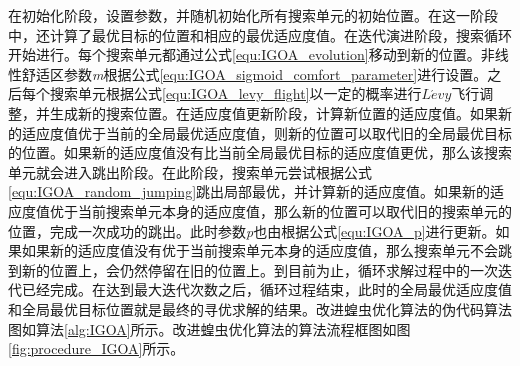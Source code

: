 在初始化阶段，设置参数，并随机初始化所有搜索单元的初始位置。在这一阶段中，还计算了最优目标的位置和相应的最优适应度值。在迭代演进阶段，搜索循环开始进行。每个搜索单元都通过公式\ref{equ:IGOA_evolution}移动到新的位置。非线性舒适区参数\emph{m}根据公式\ref{equ:IGOA_sigmoid_comfort_parameter}进行设置。之后每个搜索单元根据公式\ref{equ:IGOA_levy_flight}以一定的概率进行$L\acute{e}vy$飞行调整，并生成新的搜索位置。在适应度值更新阶段，计算新位置的适应度值。如果新的适应度值优于当前的全局最优适应度值，则新的位置可以取代旧的全局最优目标的位置。如果新的适应度值没有比当前全局最优目标的适应度值更优，那么该搜索单元就会进入跳出阶段。在此阶段，搜索单元尝试根据公式\ref{equ:IGOA_random_jumping}跳出局部最优，并计算新的适应度值。如果新的适应度值优于当前搜索单元本身的适应度值，那么新的位置可以取代旧的搜索单元的位置，完成一次成功的跳出。此时参数\emph{p}也由根据公式\ref{equ:IGOA_p}进行更新。如果如果新的适应度值没有优于当前搜索单元本身的适应度值，那么搜索单元不会跳到新的位置上，会仍然停留在旧的位置上。到目前为止，循环求解过程中的一次迭代已经完成。在达到最大迭代次数之后，循环过程结束，此时的全局最优适应度值和全局最优目标位置就是最终的寻优求解的结果。改进蝗虫优化算法的伪代码算法图如算法\ref{alg:IGOA}所示。改进蝗虫优化算法的算法流程框图如图\ref{fig:procedure_IGOA}所示。

